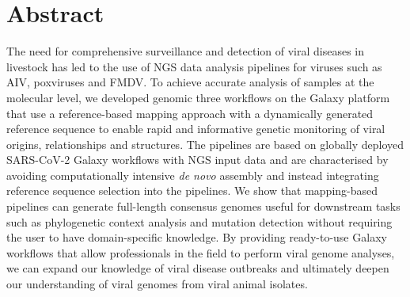 \chapter*{Abstract}
The need for comprehensive surveillance and detection of viral diseases in livestock has led to the use of \ac{NGS} data analysis pipelines for viruses such as \ac{AIV}, poxviruses and \ac{FMDV}. To achieve accurate analysis of samples at the molecular level, we developed genomic three workflows on the Galaxy platform that use a reference-based mapping approach with a dynamically generated reference sequence to enable rapid and informative genetic monitoring of viral origins, relationships and structures. The pipelines are based on globally deployed SARS-CoV-2 Galaxy workflows with \ac{NGS} input data and are characterised by avoiding computationally intensive \textit{de novo} assembly and instead integrating reference sequence selection into the pipelines. We show that mapping-based pipelines can generate full-length consensus genomes useful for downstream tasks such as phylogenetic context analysis and mutation detection without requiring the user to have domain-specific knowledge. By providing ready-to-use Galaxy workflows that allow professionals in the field to perform viral genome analyses, we can expand our knowledge of viral disease outbreaks and ultimately deepen our understanding of viral genomes from viral animal isolates.